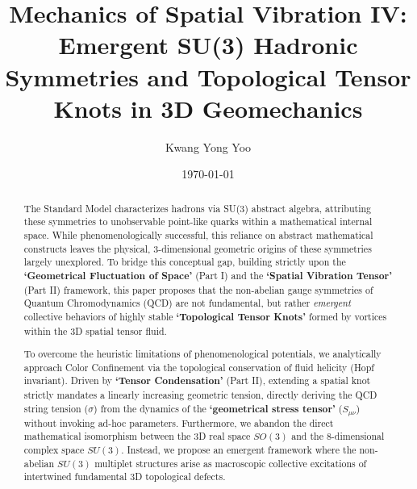 \documentclass[reprint,amsmath,amssymb,aps,prd]{revtex4-2}
\begin{document}

\title{Mechanics of Spatial Vibration IV: Emergent SU(3) Hadronic Symmetries and Topological Tensor Knots in 3D Geomechanics}

\author{Kwang Yong Yoo}

\date{\today}

\begin{abstract}
The Standard Model characterizes hadrons via SU(3) abstract algebra, attributing these symmetries to unobservable point-like quarks within a mathematical internal space. While phenomenologically successful, this reliance on abstract mathematical constructs leaves the physical, 3-dimensional geometric origins of these symmetries largely unexplored. To bridge this conceptual gap, building strictly upon the \textbf{`Geometrical Fluctuation of Space'} (Part I) and the \textbf{`Spatial Vibration Tensor'} (Part II) framework, this paper proposes that the non-abelian gauge symmetries of Quantum Chromodynamics (QCD) are not fundamental, but rather \textit{emergent} collective behaviors of highly stable \textbf{`Topological Tensor Knots'} formed by vortices within the 3D spatial tensor fluid.

To overcome the heuristic limitations of phenomenological potentials, we analytically approach Color Confinement via the topological conservation of fluid helicity (Hopf invariant). Driven by \textbf{`Tensor Condensation'} (Part II), extending a spatial knot strictly mandates a linearly increasing geometric tension, directly deriving the QCD string tension ($\sigma$) from the dynamics of the \textbf{`geometrical stress tensor'} ($S_{\mu\nu}$) without invoking ad-hoc parameters. Furthermore, we abandon the direct mathematical isomorphism between the 3D real space $SO(3)$ and the 8-dimensional complex space $SU(3)$. Instead, we propose an emergent framework where the non-abelian $SU(3)$ multiplet structures arise as macroscopic collective excitations of intertwined fundamental 3D topological defects.


\end{abstract}
\end{document}

